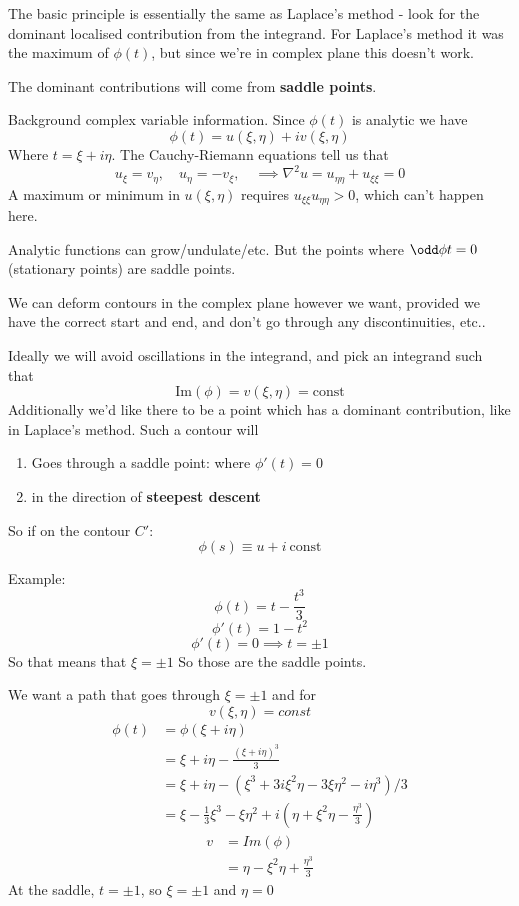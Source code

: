 \documentclass{X:/Documents/Coding/Latex/myassignment}
\begin{document}
The basic principle is essentially the same as Laplace's method - look for the dominant localised contribution from the integrand. For Laplace's method it was the maximum of $\phi(t)$, but since we're in complex plane this doesn't work. 

The dominant contributions will come from \textbf{saddle points}. 

Background complex variable information. Since $\phi(t)$ is analytic we have
\[\phi(t) = u(\xi,\eta) + iv(\xi,\eta)\]
Where $ t = \xi + i\eta$. The Cauchy-Riemann equations tell us that
\[u_\xi = v_\eta, \quad u_\eta = -v_\xi, \quad \implies \nabla^2 u = u_{\eta\eta} + u_{\xi\xi} = 0\]
A maximum or minimum in $u(\xi,\eta)$ requires $u_{\xi\xi}u_{\eta\eta} > 0$, which can't happen here.

Analytic functions can grow/undulate/etc. But the points where $\odd \phi t = 0$ (stationary points) are saddle points. 

We can deform contours in the complex plane however we want, provided we have the correct start and end, and don't go through any discontinuities, etc..

Ideally we will avoid oscillations in the integrand, and pick an integrand such that
\[\mathrm{Im}(\phi) = v(\xi,\eta) = \mathrm{const}\]
Additionally we'd like there to be a point which has a dominant contribution, like in Laplace's method.
Such a contour will
\begin{enumerate}
    \item Goes through a saddle point: where $\phi'(t) =0 $
    \item in the direction of \textbf{steepest descent}
\end{enumerate}

So if on the contour $C'$:
\[\phi(s) \equiv u + i\ \mathrm{const}\]


Example:
\[\phi(t) = t - \frac{t^3}{3}\]
\[\phi'(t) = 1 - t^2\]
\[\phi'(t) = 0 \implies t = \pm 1\]
So that means that $\xi=\pm 1$
So those are the saddle points.

We want a path that goes through $\xi = \pm 1$ and for 
\[v(\xi,\eta) = const\]
\begin{align*}
    \phi(t) &= \phi(\xi+i\eta)\\
    &=\xi + i \eta - \frac{(\xi + i\eta)^3}{3}\\
    &= \xi + i \eta - (\xi^3 + 3 i \xi^2 \eta - 3\xi\eta^2 - i\eta^3)/3\\
    &= \xi - \frac13\xi^3 - \xi\eta^2 +i\left(\eta +\xi^2\eta - \frac{\eta^3}3\right)
\end{align*}
\begin{align*}
    v &= Im(\phi)\\
    &=\eta -\xi^2\eta + \frac{\eta^3}3
\end{align*}
At the saddle, $t = \pm1$, so $\xi = \pm 1$ and $\eta = 0$
\end{document}
